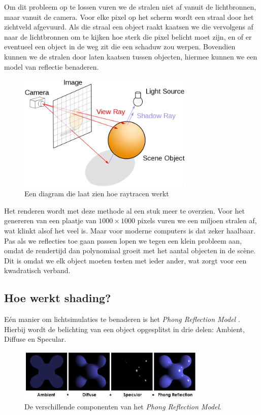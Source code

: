 \documentclass[12pt, a4paper]{article}
\begin{document}
Om dit probleem op te lossen vuren we de stralen niet af vanuit de lichtbronnen, maar vanuit de camera. Voor elke pixel op het scherm wordt een straal door het zichtveld afgevuurd. Als die straal een object raakt kaatsen we die vervolgens af naar de lichtbronnen om te kijken hoe sterk die pixel belicht moet zijn, en of er eventueel een object in de weg zit die een schaduw zou werpen. Bovendien kunnen we de stralen door laten kaatsen tussen objecten, hiermee kunnen we een model van reflectie benaderen. 

\begin{figure}[H]
    \centering
    \includegraphics[width=0.75\textwidth]{raytracing_diagram.png}
    \caption{Een diagram die laat zien hoe raytracen werkt}
    \label{fig:raytracing_diagram}
\end{figure}

Het renderen wordt met deze methode al een stuk meer te overzien. Voor het genereren van een plaatje van \(1000\times 1000\) pixels vuren we een miljoen stralen af, wat klinkt alsof het veel is. Maar voor moderne computers is dat zeker haalbaar. Pas als we reflecties toe gaan passen lopen we tegen een klein probleem aan, omdat de rendertijd dan polynomiaal groeit met het aantal objecten in de scène. Dit is omdat we elk object moeten testen met ieder ander, wat zorgt voor een kwadratisch verband.

\subsection{Hoe werkt shading?}
Eén manier om lichtsimulaties te benaderen is het \emph{Phong Reflection Model} \cite{PhongReflectionModel}. Hierbij wordt de belichting van een object opgesplitst in drie delen: Ambient, Diffuse en Specular.
\begin{figure}[H]
\centering
\includegraphics[width=0.8\textwidth]{Phong_components.png}
\caption{De verschillende componenten van het \emph{Phong Reflection Model}.}
\label{fig:phong_components}
\end{figure}
\end{document}
